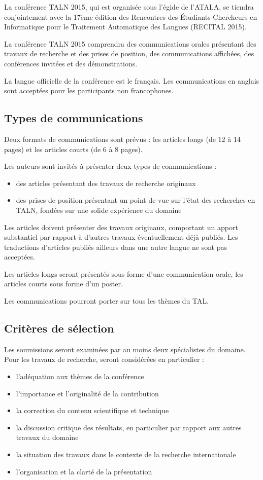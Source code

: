\documentclass[10pt,a4paper,twoside]{article}
\begin{document}
La conférence TALN 2015, qui est organisée sous l’égide de l’ATALA, se tiendra conjointement avec la 17ème édition des Rencontres des Étudiants Chercheurs en Informatique pour le Traitement Automatique des Langues (RECITAL 2015). 

La conférence TALN 2015 comprendra des communications orales présentant des travaux de recherche et des prises de position, des communications affichées, des conférences invitées et des démonstrations. 

La langue officielle de la conférence est le français. Les communications en anglais sont acceptées pour les participants non francophones.


\subsection{Types de communications}

Deux formats de communications sont prévus : les articles longs (de 12 à 14 pages) et les articles courts (de 6 à 8 pages).

Les auteurs sont invités à présenter deux types de communications :
\begin{itemize}
   \item des articles présentant des travaux de recherche originaux
   \item des prises de position présentant un point de vue sur l’état des recherches en TALN, fondées sur une solide expérience du domaine
\end{itemize}

Les articles doivent présenter des travaux originaux, comportant un apport substantiel par rapport à d’autres travaux éventuellement déjà publiés. Les traductions d’articles publiés ailleurs dans une autre langue ne sont pas acceptées.

Les articles longs seront présentés sous forme d’une communication orale, les articles courts sous forme d’un poster.

Les communications pourront porter sur tous les thèmes du TAL.

\subsection{Critères de sélection}

Les soumissions seront examinées par au moins deux spécialistes du domaine. Pour les travaux de recherche, seront considérées en particulier :
\begin{itemize}
 \item  l’adéquation aux thèmes de la conférence
 \item  l’importance et l’originalité de la contribution
 \item  la correction du contenu scientifique et technique
 \item  la discussion critique des résultats, en particulier par rapport aux autres travaux du domaine
 \item  la situation des travaux dans le contexte de la recherche internationale
 \item  l’organisation et la clarté de la présentation
\end{itemize}
\end{document}
